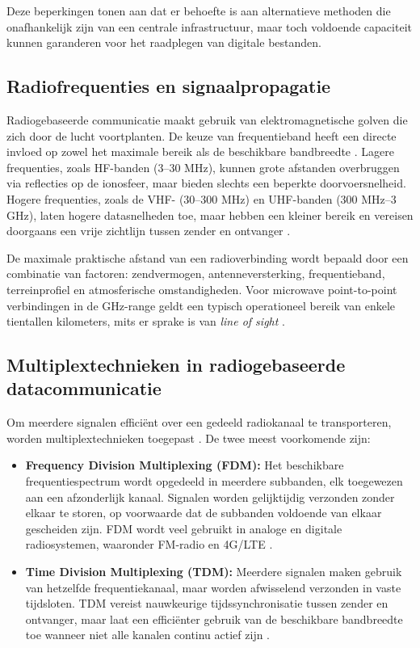 Deze beperkingen tonen aan dat er behoefte is aan alternatieve methoden die onafhankelijk zijn van een centrale infrastructuur, maar toch voldoende capaciteit kunnen garanderen voor het raadplegen van digitale bestanden.

\subsection{Radiofrequenties en signaalpropagatie}

Radiogebaseerde communicatie maakt gebruik van elektromagnetische golven die zich door de lucht voortplanten. De keuze van frequentieband heeft een directe invloed op zowel het maximale bereik als de beschikbare bandbreedte \autocite{Tanenbaum2021}. Lagere frequenties, zoals HF-banden (3--30 MHz), kunnen grote afstanden overbruggen via reflecties op de ionosfeer, maar bieden slechts een beperkte doorvoersnelheid. Hogere frequenties, zoals de VHF- (30--300 MHz) en UHF-banden (300 MHz--3 GHz), laten hogere datasnelheden toe, maar hebben een kleiner bereik en vereisen doorgaans een vrije zichtlijn tussen zender en ontvanger \autocite{Tanenbaum2021}.

De maximale praktische afstand van een radioverbinding wordt bepaald door een combinatie van factoren: zendvermogen, antenneversterking, frequentieband, terreinprofiel en atmosferische omstandigheden. Voor microwave point-to-point verbindingen in de GHz-range geldt een typisch operationeel bereik van enkele tientallen kilometers, mits er sprake is van \textit{line of sight} \autocite{MicrowavePtP5G}.

\subsection{Multiplextechnieken in radiogebaseerde datacommunicatie}

Om meerdere signalen efficiënt over een gedeeld radiokanaal te transporteren, worden multiplextechnieken toegepast \autocite{Tanenbaum2021}. De twee meest voorkomende zijn:

\begin{itemize}
  \item \textbf{Frequency Division Multiplexing (FDM):} Het beschikbare frequentiespectrum wordt opgedeeld in meerdere subbanden, elk toegewezen aan een afzonderlijk kanaal. Signalen worden gelijktijdig verzonden zonder elkaar te storen, op voorwaarde dat de subbanden voldoende van elkaar gescheiden zijn. FDM wordt veel gebruikt in analoge en digitale radiosystemen, waaronder FM-radio en 4G/LTE \autocite{Tanenbaum2021}.
  \item \textbf{Time Division Multiplexing (TDM):} Meerdere signalen maken gebruik van hetzelfde frequentiekanaal, maar worden afwisselend verzonden in vaste tijdsloten. TDM vereist nauwkeurige tijdssynchronisatie tussen zender en ontvanger, maar laat een efficiënter gebruik van de beschikbare bandbreedte toe wanneer niet alle kanalen continu actief zijn \autocite{Tanenbaum2021}.
\end{itemize}

